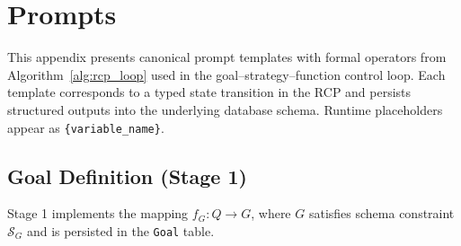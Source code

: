 


\section{Prompts}
\label{app:prompts}

This appendix presents canonical prompt templates with formal operators from Algorithm~\ref{alg:rcp_loop} used in the goal–strategy–function control loop.
Each template corresponds to a typed state transition in the RCP and persists structured outputs into the underlying database schema.
Runtime placeholders appear as \texttt{\{variable\_name\}}.

\subsection{Goal Definition (Stage 1)}

Stage 1 implements the mapping
\( f_G : Q \rightarrow G \),
where \( G \) satisfies schema constraint \( \mathcal{S}_G \) and is persisted in the \texttt{Goal} table.

